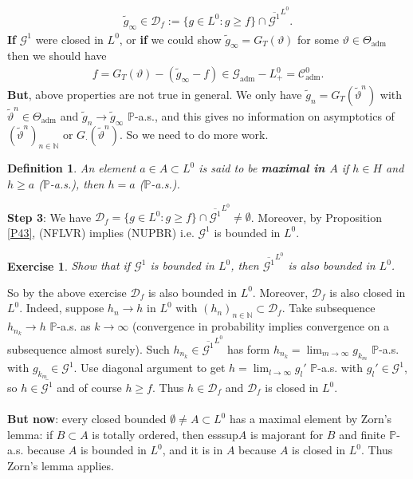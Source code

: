 \documentclass[12pt,a4paper, twoside]{article}
\newtheorem{defn}{Definition}[section]
\newtheorem{exe}{Exercise}[section]
\theoremstyle{definition}
\newcommand{\PP}{\mathbb{P}} %
\begin{document}
\begin{align*}
\widetilde{g}_\infty \in \mathcal{D}_f:= \{ g \in L^0: g \geq f\} \cap \overline{\mathcal{G}^1}^{L^0}.
\end{align*}
\textbf{If} $\mathcal{G}^1$ were closed in $L^0$, or \textbf{if} we could show $\widetilde{g}_\infty = G_T( \vartheta)$ for some $\vartheta \in \Theta_\text{adm}$ then we should have 
\begin{align*}
f= G_T( \vartheta)- ( \widetilde{g}_\infty -f) \in \mathcal{G}_\text{adm}-L_+^0= \mathcal{C}_\text{adm}^0.
\end{align*}
\textbf{But}, above properties are not true in general. We only have $\widetilde{g}_n = G_T( \widetilde{\vartheta}^n)$ with $\widetilde{\vartheta}^n \in \Theta_\text{adm}$ and $\widetilde{g}_n \to \widetilde{g}_\infty$ $\PP$-a.s., and this gives no information on asymptotics of $( \widetilde{\vartheta}^n)_{n \in \mathbb{N}}$ or $G_\cdot ( \widetilde{\vartheta}^n)$. So we need to do more work. 
\newpage
\begin{defn} An element $a \in A \subset L^0$ is said to be \textbf{maximal in $A$} if $h \in H$ and $h \geq a$ ($\PP$-a.s.), then $h=a$ ($\PP$-a.s.).
\end{defn}
\noindent \textbf{Step 3}: We have $\mathcal{D}_f = \{ g \in L^0: g \geq f \} \cap \overline{ \mathcal{G}^1}^{L^0} \neq \emptyset$. Moreover, by Proposition \ref{P43}, (NFLVR) implies (NUPBR) i.e. $\mathcal{G}^1$ is bounded in $L^0$. 
\begin{exe} Show that if $\mathcal{G}^1$ is bounded in $L^0$, then $\overline{\mathcal{G}^1}^{L^0}$ is also bounded in $L^0$.
\end{exe}
\noindent So by the above exercise $\mathcal{D}_f$ is also bounded in $L^0$. Moreover, $\mathcal{D}_f$ is also closed in $L^0$. Indeed, suppose $h_n \to h$ in $L^0$ with $(h_n)_{n \in \mathbb{N}} \subset \mathcal{D}_f$. Take subsequence $h_{n_k} \to h$ $\PP$-a.s. as $k \to \infty$ (convergence in probability implies convergence on a subsequence almost surely). Such $h_{n_k} \in \overline{\mathcal{G}^1}^{L^0}$ has form $h_{n_k} = \lim_{m \to \infty} g_{k_m}$ $\PP$-a.s. with $g_{k_m} \in \mathcal{G}^1$. Use diagonal argument to get $h = \lim_{l \to \infty} g_l'$ $\PP$-a.s. with $g_l' \in \mathcal{G}^1$, so $h \in \overline{\mathcal{G}^1}$ and of course $h \geq f$. Thus $h \in \mathcal{D}_f$ and $\mathcal{D}_f$ is closed in $L^0$. 
\\\\
\textbf{But now}: every closed bounded $\emptyset \neq A \subset L^0$ has a maximal element by Zorn's lemma: if $B \subset A$ is totally ordered, then esssup$A$ is majorant for $B$ and finite $\PP$-a.s. because $A$ is bounded in $L^0$, and it is in $A$ because $A$ is closed in $L^0$. Thus Zorn's lemma applies. 
\end{document}
